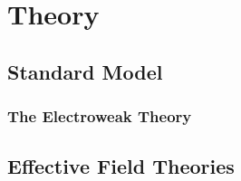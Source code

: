 \chapter{Theory}
\label{sec:theory}
\section{Standard Model}
\subsection{The Electroweak Theory}
\section{Effective Field Theories}


